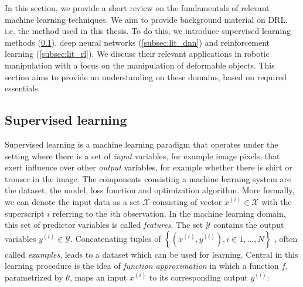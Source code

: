 \documentclass[\home/main.tex]{subfiles}
\begin{document}
In this section, we provide a short review on the fundamentals of relevant machine learning techniques. We aim to provide background material on \acrfull{DRL}, i.e. the method used in this thesis. To do this, we introduce supervised learning methods (\cref{subsec:lit_sl}), deep neural networks (\cref{subsec:lit_dnn}) and reinforcement learning (\cref{subsec:lit_rl}). We discuss their relevant applications in robotic manipulation with a focus on the manipulation of deformable objects. This section aims to provide an understanding on these domains, based on required essentials. %

\subsection{Supervised learning} \label{subsec:lit_sl}




\newcommand*{\prob}{\mathrm{P}}

Supervised learning is a machine learning paradigm that operates under the setting where there is a set of \textit{input} variables, for example image pixels, that exert influence over other \textit{output} variables, for example whether there is shirt or trouser in the image.
The components consisting a machine learning system are the dataset, the model, loss function and optimization algorithm. 
More formally, we can denote the input data as a set $\mathcal{X}$ consisting of vector $x^{(i)} \in \mathcal{X} $ with the superscript $i$ referring to the $i$th observation. In the machine learning domain, this set of predictor variables is called \textit{features}. The set $\mathcal{Y}$ contains the output variables $y^{(i)} \in \mathcal{Y}$. Concatenating tuples of 
$\left\{\left(x^{(i)}, y^{(i)}\right) , i \in 1,\dots,N \right\}$
, often called \textit{examples}, leads to a dataset which can be used for learning. Central in this learning procedure is the idea of \textit{function approximation} in which a function $f$, parametrized by $\theta$, maps an input $x^{(i)}$ to its corresponding output $y^{(i)}$:
\end{document}
